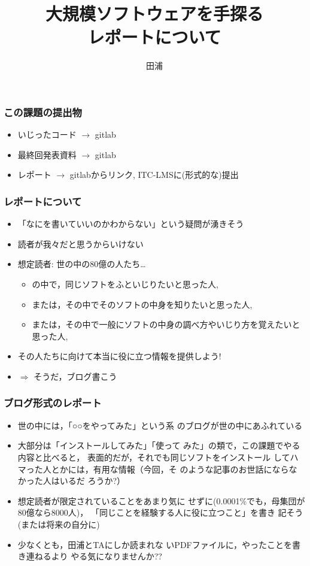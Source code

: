 \documentclass[12pt,dvipdfmx]{beamer}
\title{大規模ソフトウェアを手探る \\ レポートについて}
\institute{}
\author{田浦}
\date{}
\newcommand{\aka}[1]{{\color{red}#1}}
\begin{document}
\maketitle

\begin{frame}
\frametitle{この課題の提出物}
\begin{itemize}
\item いじったコード $\rightarrow$ gitlab
\item 最終回発表資料 $\rightarrow$ gitlab
\item \aka{レポート} $\rightarrow$ gitlabからリンク, ITC-LMSに(形式的な)提出
\end{itemize}
\end{frame}


\begin{frame}
\frametitle{レポートについて}
\begin{itemize}
\item<1-> 「なにを書いていいのかわからない」という疑問が湧きそう
\item<2-> 読者が我々だと思うからいけない
\item<3-> 想定読者: 世の中の80億の人たち\ldots 
  \begin{itemize}
  \item の中で，同じソフトをふといじりたいと思った人, 
  \item または，その中でそのソフトの中身を知りたいと思った人, 
  \item または，その中で一般にソフトの中身の調べ方やいじり方を覚えたいと思った人, 
  \end{itemize}
\item<4-> その人たちに向けて本当に役に立つ情報を提供しよう!
\item<5-> $\Rightarrow$ そうだ，\aka{ブログ書こう}
\end{itemize}
\end{frame}

\begin{frame}
\frametitle{ブログ形式のレポート}
\begin{itemize}

\item<1-> 世の中には，「○○をやってみた」という系
  のブログが世の中にあふれている

\item<2-> 大部分は「インストールしてみた」「使って
  みた」の類で，この課題でやる内容と比べると，
  表面的だが，それでも同じソフトをインストール
  してハマった人とかには，有用な情報（今回，そ
  のような記事のお世話にならなかった人はいるだ
  ろうか?）

\item<3-> 想定読者が限定されていることをあまり気に
  せずに(0.0001\%でも，母集団が80億なら8000人)，
  「同じことを経験する人に役に立つこと」を書き
  記そう(または将来の自分に)

\item<4-> 少なくとも，田浦とTAにしか読まれな
  いPDFファイルに，やったことを書き連ねるより
  やる気になりませんか??
\end{itemize}
\end{frame}
\end{document}
